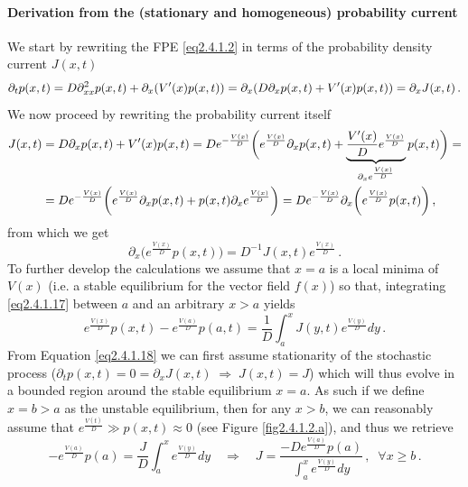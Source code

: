 \documentclass[../main.tex]{subfiles}
\begin{document}
\paragraph{Derivation from the (stationary and homogeneous) probability current}
We start by rewriting the FPE \eqref{eq2.4.1.2} in terms of the probability density current $J(x,t)$
\begin{equation}\label{eq2.4.1.16}
     \partial_{t}p(x,t)=D\partial_{xx}^{2}p(x,t)+\partial_{x}(V'(x)p(x,t))=\partial_{x}(D\partial_{x}p(x,t)+V'(x)p(x,t))=\partial_{x}J(x,t)\,.
\end{equation}
We now proceed by rewriting the probability current itself
\begin{align*}
        J(x,t) &= D\partial_{x}p(x,t)+V'(x)p(x,t) = D e^{-\frac{V(x)}{D}}\bigg(e^{\frac{V(x)}{D}}\partial_{x}p(x,t) + \underbrace{\frac{V'(x)}{D}e^{\frac{V(x)}{D}}}_{\partial_{x}e^{\frac{V(x)}{D}}}p(x,t)\bigg) = \nonumber \\ 
               &= D e^{-\frac{V(x)}{D}}\bigg(e^{\frac{V(x)}{D}}\partial_{x}p(x,t) + p(x,t)\partial_{x}e^{\frac{V(x)}{D}}\bigg)=D e^{-\frac{V(x)}{D}}\partial_{x}\bigg(e^{\frac{V(x)}{D}}p(x,t)\bigg)\,, \nonumber 
\end{align*}
from which we get
\begin{equation}\label{eq2.4.1.17}
    \partial_{x}\bigg(e^{\frac{V(x)}{D}}p(x,t)\bigg) = D^{-1}J(x,t)e^{\frac{V(x)}{D}}\,.
\end{equation}
To further develop the calculations we assume that $x=a$ is a local minima of $V(x)$ (i.e. a stable equilibrium for the vector field $f(x)$) so that, integrating \eqref{eq2.4.1.17} between $a$ and an arbitrary $x>a$ yields
\begin{equation}\label{eq2.4.1.18}
     e^{\frac{V(x)}{D}}p(x,t) - e^{\frac{V(a)}{D}}p(a,t)=\frac{1}{D}\int_{a}^{x}J(y,t)e^{\frac{V(y)}{D}}dy\,.
\end{equation}
From Equation \eqref{eq2.4.1.18} we can first assume stationarity of the stochastic process ($\partial_{t}p(x,t)=0=\partial_{x}J(x,t)\;\Rightarrow\;J(x,t)=J$) which will thus evolve in a bounded region around the stable equilibrium $x=a$.
As such if we define $x=b>a$ as the unstable equilibrium, then for any $x>b$, we can reasonably assume that $e^{\frac{V(t)}{D}}\gg p(x,t)\approx0$ (see Figure \ref{fig2.4.1.2.a}), and thus we retrieve
\begin{equation}\label{eq2.4.1.19}
     -e^{\frac{V(a)}{D}}p(a)=\frac{J}{D}\int_{a}^{x}e^{\frac{V(y)}{D}}dy\quad\Rightarrow\quad J = \frac{-De^{\frac{V(a)}{D}}p(a)}{\int_{a}^{x}e^{\frac{V(y)}{D}}dy}\,,\;\;\forall x\geq b\,.
\end{equation}
\end{document}
